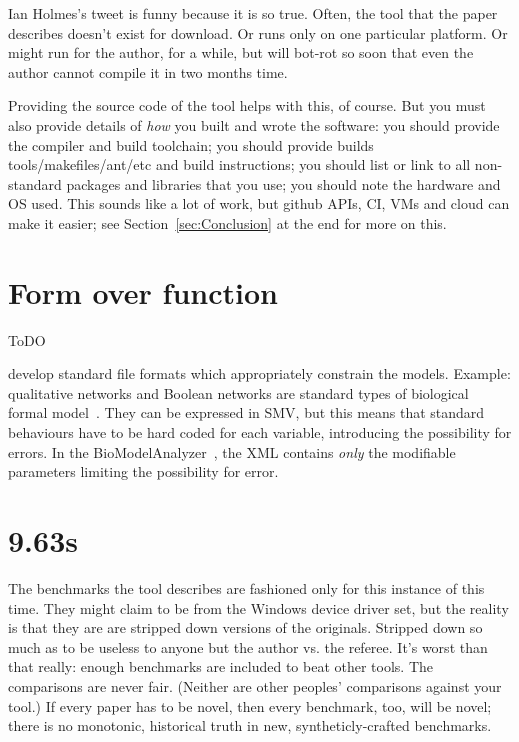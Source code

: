 \documentclass[conference]{IEEEtran}
\begin{document}
Ian Holmes's tweet is funny because it is so true. Often, the tool
that the paper describes doesn't exist for download. Or runs only on
one particular platform. Or might run for the author, for a while, but
will bot-rot so soon that even the author cannot compile it in two
months time.

Providing the source code of the tool helps with this, of course. But
you must also provide details of \emph{how} you built and wrote the
software:
%
you should provide the compiler and build toolchain; 
%
you should provide builds tools/makefiles/ant/etc and build instructions; 
%
you should list or link to all non-standard packages and libraries that you use; 
%
you should note the hardware and OS used. 
%
This sounds like a lot of work, but github APIs, CI, VMs and cloud can
make it easier; see Section~\ref{sec:Conclusion} at the end for more
on this.


\section{Form over function}

ToDO 

develop standard file formats which appropriately constrain the
models. Example: qualitative networks and Boolean networks are
standard types of biological formal
model~\cite{Kauffman1969,Schaub2007}. They can be expressed in SMV,
but this means that standard behaviours have to be hard coded for each
variable, introducing the possibility for errors. In the
BioModelAnalyzer~\cite{Benque2012}, the XML contains \emph{only} the
modifiable parameters limiting the possibility for error.


\section{9.63s} 

The benchmarks the tool describes are fashioned only for this instance
of this time. They might claim to be from the Windows device driver
set, but the reality is that they are are stripped down versions of
the originals. Stripped down so much as to be useless to anyone but
the author vs. the referee. It's worst than that really: enough
benchmarks are included to beat other tools. The comparisons are never
fair. (Neither are other peoples' comparisons against your tool.) If
every paper has to be novel, then every benchmark, too, will be novel;
there is no monotonic, historical truth in new, syntheticly-crafted
benchmarks.
\end{document}
